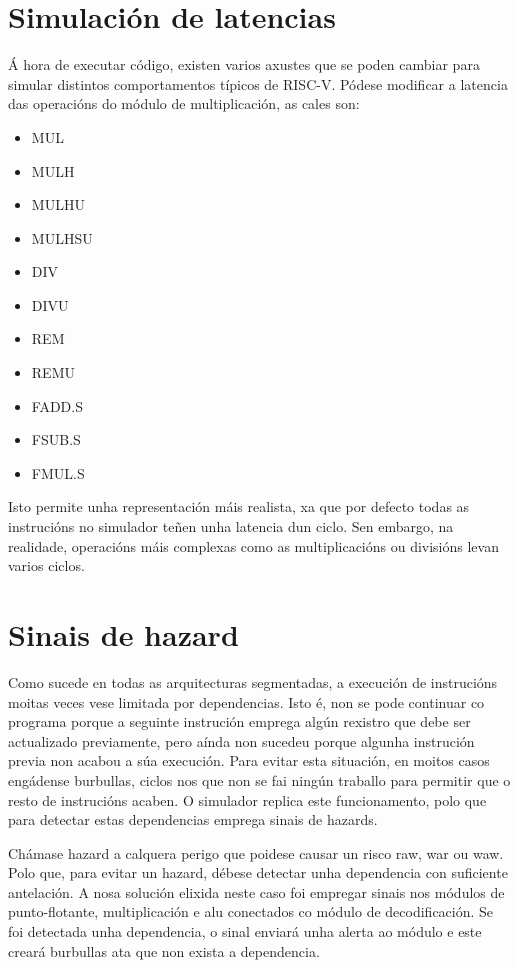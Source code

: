 \section{Simulación de latencias}\label{sec:sim_latencias}
Á hora de executar código, existen varios axustes que se poden cambiar para simular distintos comportamentos típicos de RISC-V. Pódese modificar a latencia  das operacións do módulo de multiplicación, as cales son: 
\begin{itemize}
    \item MUL
    \item MULH
    \item MULHU
    \item MULHSU
    \item DIV
    \item DIVU
    \item REM
    \item REMU
    \item FADD.S
    \item FSUB.S
    \item FMUL.S
\end{itemize}
Isto permite unha representación máis realista, xa que por defecto todas as instrucións no simulador teñen unha latencia dun ciclo. Sen embargo, na realidade, operacións máis complexas como as multiplicacións ou divisións levan varios ciclos.

\section{Sinais de hazard}\label{sec:hazards}
Como sucede en todas as \gls{arquitecturas} segmentadas, a execución de instrucións moitas veces vese limitada por dependencias. Isto é, non se pode continuar co programa porque a seguinte instrución emprega algún rexistro que debe ser actualizado previamente, pero aínda non sucedeu porque algunha instrución previa non acabou a súa execución. Para evitar esta situación, en moitos casos engádense burbullas, ciclos nos que non se fai ningún traballo para permitir que o resto de instrucións acaben. O simulador replica este funcionamento, polo que para detectar estas dependencias emprega sinais de \gls{hazards}.

Chámase hazard a calquera perigo que poidese causar un risco \acrfull{raw}, \acrfull{war} ou \acrfull{waw}. Polo que, para evitar un hazard, débese detectar unha dependencia con suficiente antelación. A nosa solución elixida neste caso foi empregar sinais nos módulos de punto-flotante, multiplicación e \acrshort{alu} conectados co módulo de decodificación. Se foi detectada unha dependencia, o sinal enviará unha alerta ao módulo e este creará burbullas ata que non exista a dependencia.